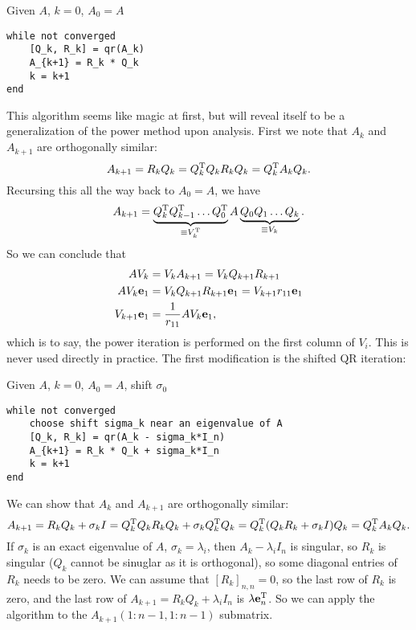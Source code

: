 \documentclass{article}
\begin{document}
Given $A$, $k=0$, $A_0=A$
\begin{verbatim}
while not converged
    [Q_k, R_k] = qr(A_k)
    A_{k+1} = R_k * Q_k
    k = k+1
end
\end{verbatim}
This algorithm seems like magic at first, but will reveal itself to be a generalization of the power method upon analysis. First we note that $A_k$ and $A_{k+1}$ are orthogonally similar:
\begin{equation}
    A_{k+1}=R_kQ_k=Q_k^{\text{T}} Q_kR_kQ_k=Q_k^{\text{T}} A_kQ_k.
\end{equation}
Recursing this all the way back to $A_0=A$, we have
\begin{equation}
    A_{k+1}=\underbrace{Q_k^{\text{T}} Q_{k-1}^{\text{T}}\dots Q_0^{\text{T}}}_{\equiv V_k^{\text{T}}} A \underbrace{Q_0Q_1\dots Q_k}_{\equiv V_k}.
\end{equation}
So we can conclude that
\begin{align}
    AV_k&=V_kA_{k+1}=V_kQ_{k+1}R_{k+1}\\
    AV_k\bm{\mathrm{e}}_1&=V_kQ_{k+1}R_{k+1}\bm{\mathrm{e}}_1=V_{k+1}r_{11}\bm{\mathrm{e}}_1\\
    V_{k+1}\bm{\mathrm{e}}_1&=\frac{1}{r_{11}}AV_k\bm{\mathrm{e}}_1,
\end{align}
which is to say, the power iteration is performed on the first column of $V_i$. This is never used directly in practice. The first modification is the shifted QR iteration:

Given $A$, $k=0$, $A_0=A$, shift $\sigma_0$
\begin{verbatim}
while not converged
    choose shift sigma_k near an eigenvalue of A
    [Q_k, R_k] = qr(A_k - sigma_k*I_n)
    A_{k+1} = R_k * Q_k + sigma_k*I_n
    k = k+1
end
\end{verbatim}
We can show that $A_k$ and $A_{k+1}$ are orthogonally similar:
\begin{equation}
    A_{k+1}=R_kQ_k+\sigma_kI=Q_k^{\text{T}} Q_kR_kQ_k+\sigma_kQ_k^{\text{T}} Q_k=Q_k^{\text{T}}(Q_kR_k+\sigma_kI)Q_k=Q_k^{\text{T}} A_kQ_k.
\end{equation}
If $\sigma_k$ is an exact eigenvalue of $A$, $\sigma_k=\lambda_i$, then $A_k-\lambda_iI_n$ is singular, so $R_k$ is singular ($Q_k$ cannot be sinuglar as it is orthogonal), so some diagonal entries of $R_k$ needs to be zero. We can assume that $[R_k]_{n,n}= 0$, so the last row of $R_k$ is zero, and the last row of $A_{k+1}=R_kQ_k+\lambda_iI_n$ is $\lambda\bm{\mathrm{e}}_n^{\text{T}}$. So we can apply the algorithm to the $A_{k+1}(1:n-1,1:n-1)$ submatrix.
\end{document}
